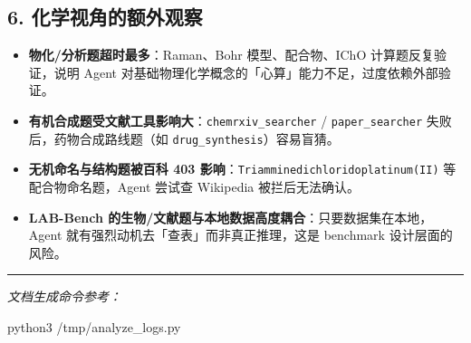 \documentclass[
]{achemso}
\newenvironment{Shaded}{}{}
\newcommand{\ExtensionTok}[1]{#1}
\newcommand{\NormalTok}[1]{#1}
\providecommand{\tightlist}{%
  \setlength{\itemsep}{0pt}\setlength{\parskip}{0pt}}
\begin{document}
\hypertarget{ux5316ux5b66ux89c6ux89d2ux7684ux989dux5916ux89c2ux5bdf}{%
\subsection{6.
化学视角的额外观察}\label{ux5316ux5b66ux89c6ux89d2ux7684ux989dux5916ux89c2ux5bdf}}

\begin{itemize}
\tightlist
\item
  \textbf{物化/分析题超时最多}：Raman、Bohr 模型、配合物、IChO
  计算题反复验证，说明 Agent
  对基础物理化学概念的「心算」能力不足，过度依赖外部验证。
\item
  \textbf{有机合成题受文献工具影响大}：\texttt{chemrxiv\_searcher} /
  \texttt{paper\_searcher} 失败后，药物合成路线题（如
  \texttt{drug\_synthesis}）容易盲猜。
\item
  \textbf{无机命名与结构题被百科 403
  影响}：\texttt{Triamminedichloridoplatinum(II)} 等配合物命名题，Agent
  尝试查 Wikipedia 被拦后无法确认。
\item
  \textbf{LAB-Bench
  的生物/文献题与本地数据高度耦合}：只要数据集在本地，Agent
  就有强烈动机去「查表」而非真正推理，这是 benchmark 设计层面的风险。
\end{itemize}

\begin{center}\rule{0.5\linewidth}{0.5pt}\end{center}

\emph{文档生成命令参考：}

\begin{Shaded}
\begin{Highlighting}[]
\ExtensionTok{python3}\NormalTok{ /tmp/analyze\_logs.py}
\end{Highlighting}
\end{Shaded}
\end{document}
